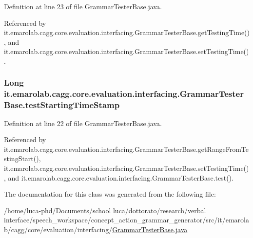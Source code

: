 Definition at line 23 of file Grammar\-Tester\-Base.\-java.



Referenced by it.\-emarolab.\-cagg.\-core.\-evaluation.\-interfacing.\-Grammar\-Tester\-Base.\-get\-Testing\-Time(), and it.\-emarolab.\-cagg.\-core.\-evaluation.\-interfacing.\-Grammar\-Tester\-Base.\-set\-Testing\-Time().

\hypertarget{classit_1_1emarolab_1_1cagg_1_1core_1_1evaluation_1_1interfacing_1_1GrammarTesterBase_a5738ac2ae4bd5d8e75a27fa9b38a3a4a}{
\subsubsection[{test\-Starting\-Time\-Stamp}]{\setlength{\rightskip}{0pt plus 5cm}Long it.\-emarolab.\-cagg.\-core.\-evaluation.\-interfacing.\-Grammar\-Tester\-Base.\-test\-Starting\-Time\-Stamp\hspace{0.3cm}{\ttfamily [private]}}}\label{classit_1_1emarolab_1_1cagg_1_1core_1_1evaluation_1_1interfacing_1_1GrammarTesterBase_a5738ac2ae4bd5d8e75a27fa9b38a3a4a}


Definition at line 22 of file Grammar\-Tester\-Base.\-java.



Referenced by it.\-emarolab.\-cagg.\-core.\-evaluation.\-interfacing.\-Grammar\-Tester\-Base.\-get\-Range\-From\-Testing\-Start(), it.\-emarolab.\-cagg.\-core.\-evaluation.\-interfacing.\-Grammar\-Tester\-Base.\-set\-Testing\-Time(), and it.\-emarolab.\-cagg.\-core.\-evaluation.\-interfacing.\-Grammar\-Tester\-Base.\-test().



The documentation for this class was generated from the following file\-:\begin{DoxyCompactItemize}
\item 
/home/luca-\/phd/\-Documents/school luca/dottorato/research/verbal interface/speech\-\_\-workspace/concept\-\_\-action\-\_\-grammar\-\_\-generator/src/it/emarolab/cagg/core/evaluation/interfacing/\hyperlink{GrammarTesterBase_8java}{Grammar\-Tester\-Base.\-java}\end{DoxyCompactItemize}
